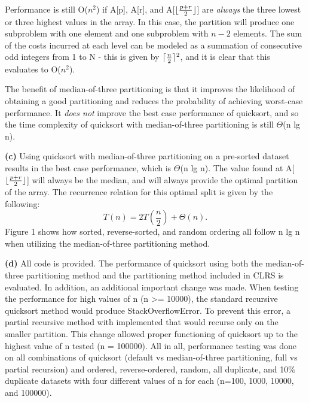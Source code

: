 \documentclass[11pt]{article}
\DeclarePairedDelimiter{\ceil}{\lceil}{\rceil}
\DeclarePairedDelimiter{\floor}{\lfloor}{\rfloor}
\renewcommand\part[1]{\vspace{.10in}\textbf{(#1)}}
\begin{document}
Performance is still O($n^2$) if A[p], A[r], and A[$\floor{\frac{p+r}{2}}$] are \textit{always} the three lowest or three highest values in the array. In this case, the partition will produce one subproblem with one element and one subproblem with $n-2$ elements. The sum of the costs incurred at each level can be modeled as a summation of consecutive odd integers from 1 to N - this is given by $\ceil{\frac{n}{2}}^2$, and it is clear that this evaluates to O($n^2$).

The benefit of median-of-three partitioning is that it improves the likelihood of obtaining a good partitioning and reduces the probability of achieving worst-case performance. It \textit{does not} improve the best case performance of quicksort, and so the time complexity of quicksort with median-of-three partitioning is still $\Theta$(n lg n).

\part{c}
Using quicksort with median-of-three partitioning on a pre-sorted dataset results in the best case performance, which is $\Theta$(n lg n). The value found at A[$\floor{\frac{p+r}{2}}$] will always be the median, and will always provide the optimal partition of the array. The recurrence relation for this optimal split is given by the following:
\begin{equation}
T(n) = 2T\left(\frac{n}{2}\right) + \Theta(n).
\end{equation}
Figure 1 shows how sorted, reverse-sorted, and random ordering all follow n lg n when utilizing the median-of-three partitioning method.

\part{d} 
All code is provided. The performance of quicksort using both the median-of-three partitioning method and the partitioning method included in CLRS is evaluated. In addition, an additional important change was made. When testing the performance for high values of n (n >= 10000), the standard recursive quicksort method would produce StackOverflowError. To prevent this error, a partial recursive method with implemented that would recurse only on the smaller partition. This change allowed proper functioning of quicksort up to the highest value of n tested (n = 100000). All in all, performance testing was done on all combinations of quicksort (default vs median-of-three partitioning, full vs partial recursion) and ordered, reverse-ordered, random, all duplicate, and 10\% duplicate datasets with four different values of n for each (n=100, 1000, 10000, and 100000). 
\end{document}
